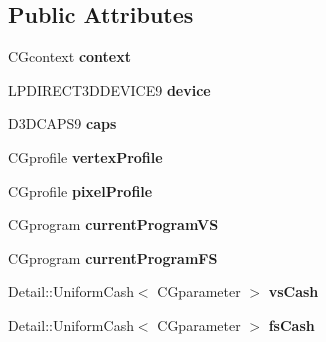\subsection*{Public Attributes}
\begin{DoxyCompactItemize}
\item 
\hypertarget{struct_cg_dx9_1_1_data_a4744644a0999c500bc41393b48450225}{C\+Gcontext {\bfseries context}}\label{struct_cg_dx9_1_1_data_a4744644a0999c500bc41393b48450225}

\item 
\hypertarget{struct_cg_dx9_1_1_data_a4d0a0fb9dda8154a5b91ba79a9288398}{L\+P\+D\+I\+R\+E\+C\+T3\+D\+D\+E\+V\+I\+C\+E9 {\bfseries device}}\label{struct_cg_dx9_1_1_data_a4d0a0fb9dda8154a5b91ba79a9288398}

\item 
\hypertarget{struct_cg_dx9_1_1_data_ace1a89a2171cb7569df9b47e434ac81f}{D3\+D\+C\+A\+P\+S9 {\bfseries caps}}\label{struct_cg_dx9_1_1_data_ace1a89a2171cb7569df9b47e434ac81f}

\item 
\hypertarget{struct_cg_dx9_1_1_data_ad52cd2a235d3a414eee4eec7e610183b}{C\+Gprofile {\bfseries vertex\+Profile}}\label{struct_cg_dx9_1_1_data_ad52cd2a235d3a414eee4eec7e610183b}

\item 
\hypertarget{struct_cg_dx9_1_1_data_a49e1fdb673ddedc453f10b738f972ee8}{C\+Gprofile {\bfseries pixel\+Profile}}\label{struct_cg_dx9_1_1_data_a49e1fdb673ddedc453f10b738f972ee8}

\item 
\hypertarget{struct_cg_dx9_1_1_data_a39fb771eefd37a0ed51d31b8d03e94c8}{C\+Gprogram {\bfseries current\+Program\+V\+S}}\label{struct_cg_dx9_1_1_data_a39fb771eefd37a0ed51d31b8d03e94c8}

\item 
\hypertarget{struct_cg_dx9_1_1_data_a7ddac8cbe05e5e9197b67ab607ff59e9}{C\+Gprogram {\bfseries current\+Program\+F\+S}}\label{struct_cg_dx9_1_1_data_a7ddac8cbe05e5e9197b67ab607ff59e9}

\item 
\hypertarget{struct_cg_dx9_1_1_data_a7888cc93650c464ab72f4f73bcff9e9c}{Detail\+::\+Uniform\+Cash$<$ C\+Gparameter $>$ {\bfseries vs\+Cash}}\label{struct_cg_dx9_1_1_data_a7888cc93650c464ab72f4f73bcff9e9c}

\item 
\hypertarget{struct_cg_dx9_1_1_data_ae91d991095d20b0f90d8e342ee416e4f}{Detail\+::\+Uniform\+Cash$<$ C\+Gparameter $>$ {\bfseries fs\+Cash}}\label{struct_cg_dx9_1_1_data_ae91d991095d20b0f90d8e342ee416e4f}


\end{DoxyCompactItemize}
